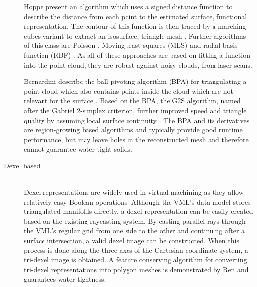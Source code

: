 \begin{description}
	Hoppe \etal present an algorithm which uses a signed distance function to describe the distance from each point to the estimated surface, \ie functional representation.
	The contour of this function is then traced by a marching cubes variant to extract an isosurface, \ie triangle mesh \cite{sdf_surface_reconstruction}.
	Further algorithms of this class are Poisson \cite{poisson}, Moving least squares (MLS) \cite{mls} and radial basis function (RBF) \cite{rbf}.
	As all of these approaches are based on fitting a function into the point cloud, they are robust against noisy clouds, \eg from laser scans.

	Bernardini \etal describe the ball-pivoting algorithm (BPA) for triangulating a point cloud which also contains points inside the cloud which are not relevant for the surface \cite{bpa}.
	Based on the BPA, the G2S algorithm, named after the Gabriel 2-simplex criterion, further improved speed and triangle quality by assuming local surface continuity \cite{g2s}.
	The BPA and its derivatives are region-growing based algorithms and typically provide good runtime performance, but may leave holes in the reconstructed mesh and therefore cannot guarantee water-tight solids.


	\item[Dexel based] \hfill \\
	Dexel representations are widely used in virtual machining as they allow  relatively easy Boolean operations.
	Although the VML's data model stores triangulated manifolds directly, a dexel representation can be easily created based on the existing raycasting system.
	By casting parallel rays through the VML's regular grid from one side to the other and continuing after a surface intersection, a valid dexel image can be constructed.
	When this process is done along the three axes of the Cartesian coordinate system, a tri-dexel image is obtained.
	A feature conserving algorithm for converting tri-dexel representations into polygon meshes is demonstrated by Ren \etal \cite{tridexel_reconstruction} and guarantees water-tightness.



\end{description}
